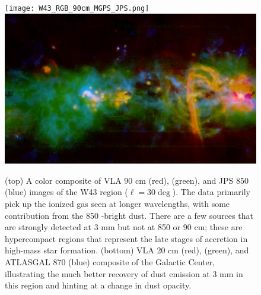 \documentclass[11pt,preprint]{aastex_nofoot}
\begin{document}

\begin{figure}
\texttt{[image: W43\_RGB\_90cm\_MGPS\_JPS.png]}
\includegraphics[width=17cm]{SgrB2_RGB_20cm_MGPSplanck_ATLASGAL.png}
\caption{
(top) A color composite of VLA 90 cm (red), \MUSTANG (green), and JPS 850 \um (blue)
images of the W43 region ($\ell=30\deg$).  The \MUSTANG data primarily pick up
the ionized gas seen at longer wavelengths, with some contribution from the 
850 \um-bright dust.  There are a few sources that are strongly detected at 3 mm
but not at 850 \um or 90 cm; these are hypercompact \hii regions that represent
the late stages of accretion in high-mass star formation.
(bottom) VLA 20 cm (red), \MUSTANG (green), and ATLASGAL 870 \um (blue) composite
of the Galactic Center, illustrating the much better recovery of dust emission
at 3 mm in this region and hinting at a change in dust opacity.
}
\label{fig:figure}
\end{figure}
\end{document}
